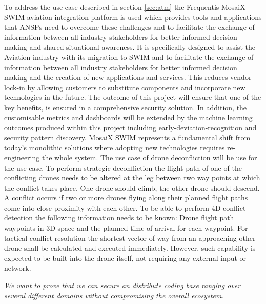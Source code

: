 \begin{Workpackage}{\thewpno}
\begin{Task}
To address the use case described in section \ref{sec:atm} the Frequentis MosaiX SWIM aviation integration platform is used which provides tools and applications that ANSPs need to overcome these challenges and to facilitate the exchange of information between all industry stakeholders for better-informed decision making and shared situational awareness. It is specifically designed to assist the Aviation industry with its migration to SWIM and to facilitate the exchange of information between all industry stakeholders for better informed decision making and the creation of new applications and services. This reduces vendor lock-in by allowing customers to substitute components and incorporate new technologies in the future. The outcome of this project will ensure that one of the key benefits, is ensured in a comprehensive security solution.
In addition, the customisable metrics and dashboards will be extended by the machine learning outcomes produced within this project including early-deviation-recognition and security pattern discovery. MosaiX SWIM represents a fundamental shift from today’s monolithic solutions where adopting new technologies requires re-engineering the whole system.
The use case of drone deconfliction will be use for the use case. To perform strategic deconfliction the flight path of one of the conflicting drones needs to be altered at the leg between two way points at which the conflict takes place. One drone should climb, the other drone should descend. A conflict occurs if two or more drones flying along their planned flight paths come into close proximity with each other. To be able to perform 4D conflict detection the following information needs to be known: Drone flight path waypoints in 3D space and the planned time of arrival for each waypoint. For tactical conflict resolution the shortest vector of way from an approaching other drone shall be calculated and executed immediately. However, such capability is expected to be built into the drone itself, not requiring any external input or network.

\emph{We want to prove that we can secure an distribute coding base ranging over several different domains without compromising the overall ecosystem.}



\end{Task}
\end{Workpackage}
